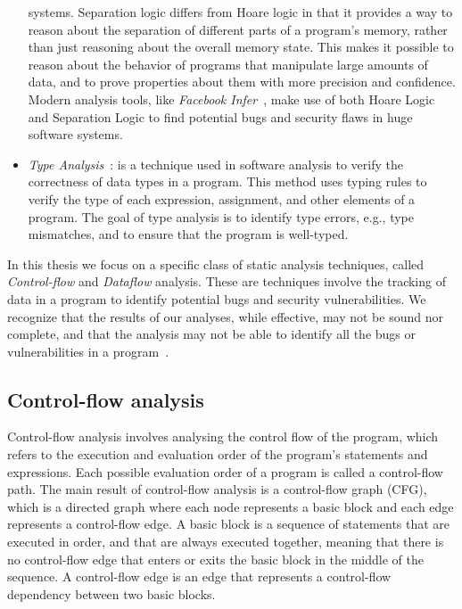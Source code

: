 \begin{itemize}
  systems. Separation logic differs from Hoare logic in that it provides a way to
  reason about the separation of different parts of a program's memory, rather
  than just reasoning about the overall memory state. This makes it possible to
  reason about the behavior of programs that manipulate large amounts of data, and
  to prove properties about them with more precision and confidence.
  Modern analysis tools, like \emph{Facebook Infer}~\cite{calcagno2011infer},
  make use of both Hoare Logic and Separation Logic to find potential bugs
  and security flaws in huge software systems.
  \item \emph{Type Analysis}~\cite{pierce2002types}: is a technique used in software analysis to verify
  the correctness of data types in a program. This method uses typing rules to verify
  the type of each expression, assignment, and other elements of a program.
  The goal of type analysis is to identify type errors, e.g., type mismatches,
  and to ensure that the program is well-typed.
\end{itemize}
In this thesis we focus on a specific class of static analysis techniques,
called \emph{Control-flow} and \emph{Dataflow} analysis. These are techniques involve the
tracking of data in a program to identify potential bugs and security vulnerabilities.
We recognize that the results of our analyses, while effective,
may not be sound nor complete, and that the analysis may not be able to identify
all the bugs or vulnerabilities in a program~\cite{livshits2015defense}.





\subsection{Control-flow analysis}
Control-flow analysis involves analysing the control flow of the program, which refers
to the execution and evaluation order of the program's statements and expressions.
Each possible evaluation order of a program is called a control-flow path.
The main result of control-flow analysis is a control-flow graph (CFG),
which is a directed graph where each node represents a basic block
and each edge represents a control-flow edge. A basic block is a sequence of
statements that are executed in order, and that are always executed together, meaning
that there is no control-flow edge that enters or exits the basic block in the middle of the sequence.
A control-flow edge is an edge that represents a control-flow dependency between two basic blocks.

